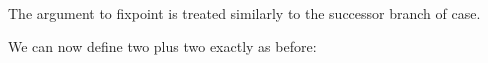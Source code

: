 \begin{fence}
\begin{code}%
\>[0]\AgdaSpace{}%
\AgdaSymbol{:}\AgdaSpace{}%
\AgdaSpace{}%
\AgdaSymbol{\{}\AgdaSymbol{\}}\AgdaSpace{}%
\AgdaSpace{}%
\AgdaSymbol{(}\AgdaSpace{}%
\AgdaOperator{\AgdaInductiveConstructor{,}}\AgdaSpace{}%
\AgdaSpace{}%
\AgdaSpace{}%
\AgdaSymbol{)}\AgdaSpace{}%
\AgdaSpace{}%
\AgdaSymbol{(}\AgdaSpace{}%
\AgdaSpace{}%
\AgdaSymbol{)}\<%
\\
\>[0]\AgdaSpace{}%
%
\>[5]\AgdaSymbol{=}%
\>[8]\AgdaSymbol{(}\AgdaSpace{}%
\AgdaSymbol{((}\AgdaSpace{}%
\AgdaSymbol{(}\AgdaOperator{\AgdaFunction{\#}}\AgdaSpace{}%
\AgdaSpace{}%
\AgdaSpace{}%
\AgdaSymbol{(}\AgdaOperator{\AgdaFunction{\#}}\AgdaSpace{}%
\AgdaSpace{}%
\AgdaSpace{}%
\AgdaOperator{\AgdaFunction{\#}}\AgdaSpace{}%
\AgdaSymbol{)))}\AgdaSpace{}%
\AgdaSpace{}%
\AgdaSymbol{(}\AgdaSpace{}%
\AgdaSymbol{(}\AgdaOperator{\AgdaFunction{\#}}\AgdaSpace{}%
\AgdaSpace{}%
\AgdaSpace{}%
\AgdaSymbol{(}\AgdaOperator{\AgdaFunction{\#}}\AgdaSpace{}%
\AgdaSpace{}%
\AgdaSpace{}%
\AgdaOperator{\AgdaFunction{\#}}\AgdaSpace{}%
\AgdaSymbol{)))))}\AgdaSpace{}%
\AgdaSpace{}%
\AgdaSymbol{(}\AgdaSpace{}%
\AgdaSymbol{)}\<%
\end{code}
\end{fence}

The argument to fixpoint is treated similarly to the successor branch of
case.

We can now define two plus two exactly as before:

